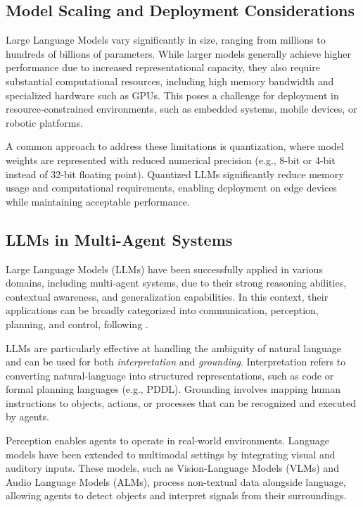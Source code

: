 \subsection{Model Scaling and Deployment Considerations}
Large Language Models vary significantly in size, ranging from millions to hundreds of billions of parameters.
While larger models generally achieve higher performance due to increased representational capacity, they also require substantial computational resources, 
including high memory bandwidth and specialized hardware such as GPUs. 
This poses a challenge for deployment in resource-constrained environments, such as embedded systems, mobile devices, or robotic platforms.

A common approach to address these limitations is quantization, 
where model weights are represented with reduced numerical precision (e.g., 8-bit or 4-bit instead of 32-bit floating point). 
Quantized LLMs significantly reduce memory usage and computational requirements, enabling deployment on edge devices while maintaining acceptable performance.

\subsection{LLMs in Multi-Agent Systems}
Large Language Models (LLMs) have been successfully applied in various domains, including multi-agent systems, due to their strong reasoning abilities, contextual awareness,
and generalization capabilities.
In this context, their applications can be broadly categorized into communication, perception, planning, and control, following \cite{kim2024llmrobots}.

LLMs are particularly effective at handling the ambiguity of natural language and can be used for both \textit{interpretation} and \textit{grounding}. 
Interpretation refers to converting natural-language into structured representations, such as code or formal planning languages (e.g., PDDL). 
Grounding involves mapping human instructions to objects, actions, or processes that can be recognized and executed by agents.

Perception enables agents to operate in real-world environments.
Language models have been extended to multimodal settings by integrating visual and auditory inputs. 
These models, such as Vision-Language Models (VLMs) and Audio Language Models (ALMs), process non-textual data alongside language, 
allowing agents to detect objects and interpret signals from their surroundings.


